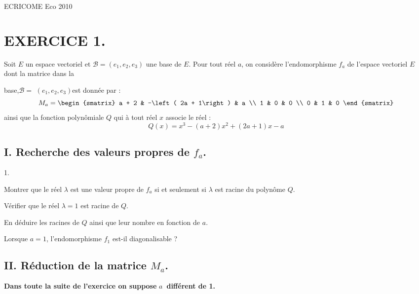 \documentclass[11pt]{article}%
\begin{document}
\begin{center}
{\Huge ECRICOME Eco 2010}
\end{center}

\section*{EXERCICE 1.}

Soit $E$ un espace vectoriel et $\mathcal{B = }\left(
e_{1},e_{2},e_{3}\right)
$ une base de $E$. Pour tout réel $a$, on considère l'endomorphisme
$f_{a}$ de l'espace vectoriel $E$ dont la matrice dans la

base,$\mathcal{B = }$ $\left( e_{1},e_{2},e_{3}\right) $est donnée par
:
\[
M_{a} = 
\begin{smatrix}
a + 2 & -\left( 2a + 1\right) & a \\
1 & 0 & 0 \\
0 & 1 & 0
\end{smatrix}
\]
ainsi que la fonction polyn\^{o}miale $Q$ qui à tout réel $x$
associe le réel :
\[
Q\left( x\right) = x^{3}-\left( a + 2\right) x^{2} + \left( 2a +
1\right) x-a
\]

\subsection*{I. Recherche des valeurs propres de $f_{a}$.}

\begin{noliste}{1.}
 \setlength{\itemsep}{4mm}
\item Montrer que le réel $\lambda $ est une valeur propre de $f_{a}$
si
et seulement si $\lambda $ est racine du polyn\^{o}me $Q$.

\item Vérifier que le réel $\lambda = 1$ est racine de $Q$.

\item En déduire les racines de $Q$ ainsi que leur nombre en fonction
de
$a$.

\item Lorsque $a = 1$, l'endomorphisme $f_{1}$ est-il diagonalisable ?
\end{noliste}

\subsection*{II. Réduction de la matrice $M_{a}$.}

\textbf{Dans toute la suite de l'exercice on suppose }$a$\textbf{\
différent de 1.}
\end{document}
